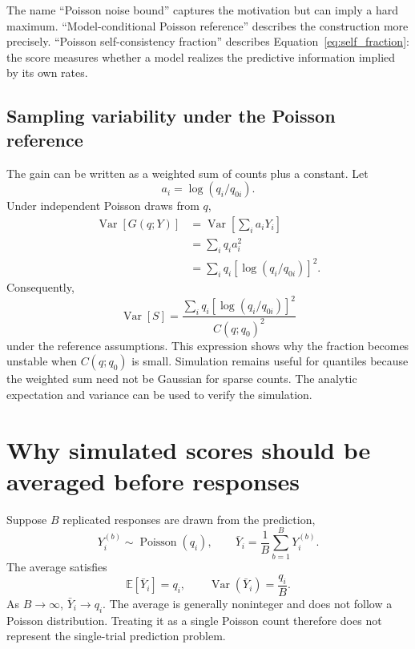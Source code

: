 \documentclass[11pt]{article}
\newcommand{\E}{\mathbb{E}}
\newcommand{\Var}{\operatorname{Var}}
\newcommand{\Pois}{\operatorname{Poisson}}
\begin{document}
The name ``Poisson noise bound'' captures the motivation but can imply a hard maximum. ``Model-conditional Poisson reference'' describes the construction more precisely. ``Poisson self-consistency fraction'' describes Equation~\ref{eq:self_fraction}: the score measures whether a model realizes the predictive information implied by its own rates.

\subsection{Sampling variability under the Poisson reference}

The gain can be written as a weighted sum of counts plus a constant. Let
\begin{equation}
a_i=\log(q_i/q_{0i}).
\end{equation}
Under independent Poisson draws from $q$,
\begin{align}
\Var[G(q;Y)]
&=\Var\left[\sum_i a_iY_i\right]\\
&=\sum_i q_i a_i^2\\
&=\boxed{\sum_i q_i\left[\log(q_i/q_{0i})\right]^2}.
\label{eq:gain_variance}
\end{align}
Consequently,
\begin{equation}
\Var[S]
=
\frac{
 \sum_i q_i[\log(q_i/q_{0i})]^2
}{C(q;q_0)^2}
\end{equation}
under the reference assumptions. This expression shows why the fraction becomes unstable when $C(q;q_0)$ is small. Simulation remains useful for quantiles because the weighted sum need not be Gaussian for sparse counts. The analytic expectation and variance can be used to verify the simulation.

\section{Why simulated scores should be averaged before responses}

Suppose $B$ replicated responses are drawn from the prediction,
\begin{equation}
Y_i^{(b)}\sim\Pois(q_i),
\qquad
\bar Y_i=\frac{1}{B}\sum_{b=1}^B Y_i^{(b)}.
\end{equation}
The average satisfies
\begin{equation}
\E[\bar Y_i]=q_i,
\qquad
\Var(\bar Y_i)=\frac{q_i}{B}.
\end{equation}
As $B\rightarrow\infty$, $\bar Y_i\rightarrow q_i$. The average is generally noninteger and does not follow a Poisson distribution. Treating it as a single Poisson count therefore does not represent the single-trial prediction problem.
\end{document}
